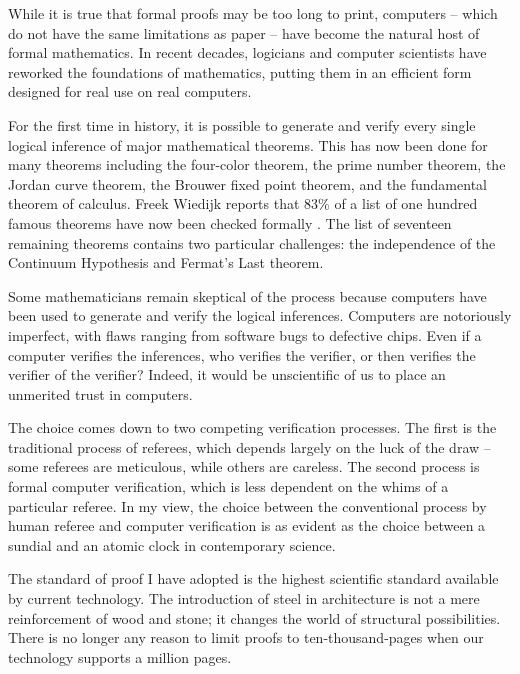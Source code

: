 While it is true that formal proofs may be too long to print,
computers -- which do not have the same limitations as paper -- have
become the natural host of formal mathematics. In recent decades,
logicians and computer scientists have reworked the foundations of
mathematics, putting them in an efficient form designed for real use
on real computers.

For the first time in history, it is possible to generate and verify
every single logical inference of major mathematical theorems.  This
has now been done for many theorems including the four-color theorem, the prime number
theorem, the Jordan curve theorem, the Brouwer fixed point theorem,
and the fundamental theorem of calculus.  Freek Wiedijk
reports that 83\% of a list of one hundred famous theorems have now been
checked formally \cite{wiedijk:100}.  The list of seventeen remaining
theorems contains two particular challenges: the independence of the
Continuum Hypothesis and Fermat's Last theorem.

Some mathematicians remain skeptical of the process because computers
have been used to generate and verify the logical inferences.
Computers are notoriously imperfect, with flaws ranging from software
bugs to defective chips.  Even if a computer verifies the inferences,
who  verifies the verifier, or then verifies the verifier of the
verifier?  Indeed, it would be unscientific of us to place an
unmerited trust in computers.

The choice comes down to two competing verification processes.  The
first is the traditional process of referees, which depends largely on
the luck of the draw -- some referees are meticulous, while others are
careless.  The second process is formal computer verification, which
is less dependent on the whims of a particular referee.  In my view,
the choice between the conventional  process by human referee and computer
verification is as evident as the choice between a sundial and an atomic
clock in contemporary science.

The standard of proof I have adopted is the highest scientific
standard available by current technology.  
The introduction of steel in
architecture is not a mere reinforcement of wood and stone; it changes
the world of structural possibilities.  There is no longer any
reason to limit proofs to ten-thousand-pages when our
technology supports a million pages.

